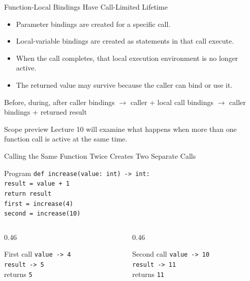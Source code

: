 \documentclass[aspectratio=169,10pt]{beamer}
\begin{document}
\begin{frame}{Function-Local Bindings Have Call-Limited Lifetime}
  \begin{itemize}
    \item Parameter bindings are created for a specific call.
    \item Local-variable bindings are created as statements in that call execute.
    \item When the call completes, that local execution environment is no longer active.
    \item The returned value may survive because the caller can bind or use it.
  \end{itemize}

  \begin{block}{Before, during, after}
    \centering
    caller bindings
    $\rightarrow$
    caller + local call bindings
    $\rightarrow$
    caller bindings + returned result
  \end{block}

  \begin{alertblock}{Scope preview}
    Lecture 10 will examine what happens when more than one function call is active at the same time.
  \end{alertblock}
\end{frame}

\begin{frame}{Calling the Same Function Twice Creates Two Separate Calls}
  \begin{block}{Program}
    \texttt{def increase(value: int) -> int:}\\
    \hspace*{0.22in}\texttt{result = value + 1}\\
    \hspace*{0.22in}\texttt{return result}\\[0.08in]
    \texttt{first = increase(4)}\\
    \texttt{second = increase(10)}
  \end{block}

  \begin{columns}[T,onlytextwidth]
    \begin{column}{0.46\textwidth}
      \begin{block}{First call}
        \texttt{value -> 4}\\
        \texttt{result -> 5}\\
        returns \texttt{5}
      \end{block}
    \end{column}

    \begin{column}{0.46\textwidth}
      \begin{block}{Second call}
        \texttt{value -> 10}\\
        \texttt{result -> 11}\\
        returns \texttt{11}
      \end{block}
    \end{column}
  \end{columns}
\end{frame}
\end{document}
